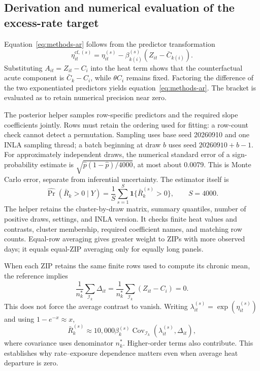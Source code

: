 \documentclass[11pt,letterpaper]{article}
\newcommand{\code}[1]{\texttt{\detokenize{#1}}}
\newcommand{\Prob}{\operatorname{Pr}}
\begin{document}
\subsection{Derivation and numerical evaluation of the excess-rate target}
\label{supp:contrast}
Equation~\eqref{eq:methods-ar} follows from the predictor transformation
\begin{equation}
 \eta_{it}^{\mathrm{cf},(s)}=\eta_{it}^{(s)}
 -\beta_{k(i)}^{(s)}(Z_{it}-\bar C_{k(i)}).
\end{equation}
Substituting \(A_{it}=Z_{it}-C_i\) into the heat term shows that the counterfactual acute component is \(\bar C_k-C_i\), while \(\theta C_i\) remains fixed. Factoring the difference of the two exponentiated predictors yields equation~\eqref{eq:methods-ar}. The bracket is evaluated as \code{-expm1(-beta * heat_delta)} to retain numerical precision near zero.

The posterior helper samples row-specific predictors and the required slope coefficients jointly. Rows must retain the ordering used for fitting: a row-count check cannot detect a permutation. Sampling uses base seed 20260910 and one INLA sampling thread; a batch beginning at draw \(b\) uses seed \(20260910+b-1\). For approximately independent draws, the numerical standard error of a sign-probability estimate is \(\sqrt{\widehat p(1-\widehat p)/4000}\), at most about 0.0079. This is Monte Carlo error, separate from inferential uncertainty.
The estimator itself is
\begin{equation}
 \widehat{\Prob}(\bar R_k>0\mid Y)=\frac1S\sum_{s=1}^{S}
 \mathbf 1\{\bar R_k^{(s)}>0\},\qquad S=4000.
\end{equation}
The helper retains the cluster-by-draw matrix, summary quantiles, number of positive draws, settings, and INLA version. It checks finite heat values and contrasts, cluster membership, required coefficient names, and matching row counts. Equal-row averaging gives greater weight to ZIPs with more observed days; it equals equal-ZIP averaging only for equally long panels.

When each ZIP retains the same finite rows used to compute its chronic mean, the reference implies
\begin{equation}
 \frac{1}{n_k^*}\sum_{\mathcal I_k}\Delta_{it}
 =\frac{1}{n_k^*}\sum_{\mathcal I_k}(Z_{it}-C_i)=0.
\end{equation}
This does not force the average contrast to vanish. Writing \(\lambda_{it}^{(s)}=\exp(\eta_{it}^{(s)})\) and using \(1-e^{-x}\approx x\),
\begin{equation}
 \bar R_k^{(s)}\approx10{,}000\beta_k^{(s)}
 \operatorname{Cov}_{\mathcal I_k}(\lambda_{it}^{(s)},\Delta_{it}),
\end{equation}
where covariance uses denominator \(n_k^*\). Higher-order terms also contribute. This establishes why rate--exposure dependence matters even when average heat departure is zero.
\end{document}
